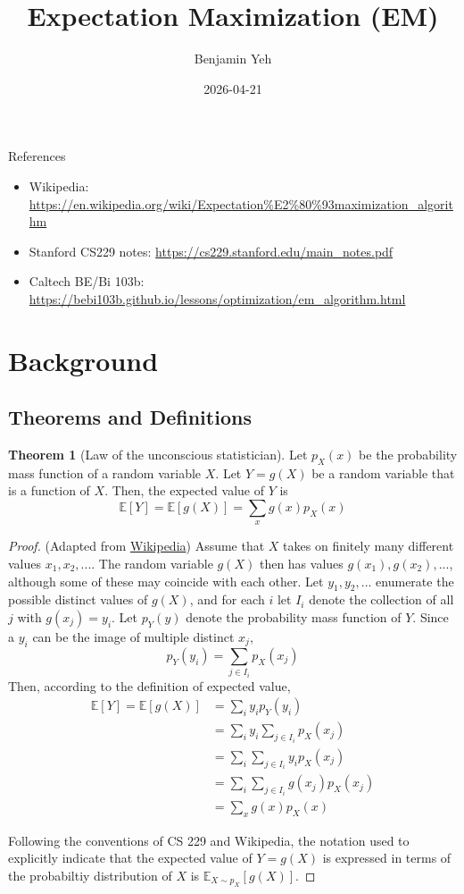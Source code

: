 \documentclass[11pt]{article}
\title{Expectation Maximization (EM)}
\author{Benjamin Yeh}
\date{2026-04-21}
\theoremstyle{definition}
\newtheorem*{theorem}{Theorem}
\begin{document}
\maketitle

References
\begin{itemize}
    \item Wikipedia: \url{https://en.wikipedia.org/wiki/Expectation%E2%80%93maximization_algorithm}
    \item Stanford CS229 notes: \url{https://cs229.stanford.edu/main_notes.pdf}
    \item Caltech BE/Bi 103b: \url{https://bebi103b.github.io/lessons/optimization/em_algorithm.html}
\end{itemize}

\section{Background}

\subsection{Theorems and Definitions}

\begin{theorem}[Law of the unconscious statistician]
Let $p_X(x)$ be the probability mass function of a random variable $X$. Let $Y = g(X)$ be a random variable that is a function of $X$. Then, the expected value of $Y$ is
$$
\mathbb{E}[Y] = \mathbb{E}[g(X)] = \sum_x g(x)p_X(x)
$$
\end{theorem}
\begin{proof}
(Adapted from \href{https://en.wikipedia.org/wiki/Law_of_the_unconscious_statistician}{Wikipedia}) Assume that $X$ takes on finitely many different values $x_1, x_2, ...$. The random variable $g(X)$ then has values $g(x_1), g(x_2), ...$, although some of these may coincide with each other. Let $y_1, y_2, ...$ enumerate the possible distinct values of $g(X)$, and for each $i$ let $I_i$ denote the collection of all $j$ with $g(x_j) = y_i$. Let $p_Y(y)$ denote the probability mass function of $Y$. Since a $y_i$ can be the image of multiple distinct $x_j$,
$$
p_Y(y_i) = \sum_{j \in I_i} p_X(x_j)
$$
Then, according to the definition of expected value,
$$
\begin{aligned}
\mathbb{E}[Y] = \mathbb{E}[g(X)]
&= \sum_i y_i p_Y(y_i) \\
&= \sum_i y_i \sum_{j \in I_i} p_X(x_j) \\
&= \sum_i \sum_{j \in I_i} y_i p_X(x_j) \\
&= \sum_i \sum_{j \in I_i} g(x_j) p_X(x_j) \\
&= \sum_x g(x) p_X(x)
\end{aligned}
$$

Following the conventions of CS 229 and Wikipedia, the notation used to explicitly indicate that the expected value of $Y = g(X)$ is expressed in terms of the probabiltiy distribution of $X$ is $\mathbb{E}_{X \sim p_X}[g(X)]$.
\end{proof}
\end{document}
